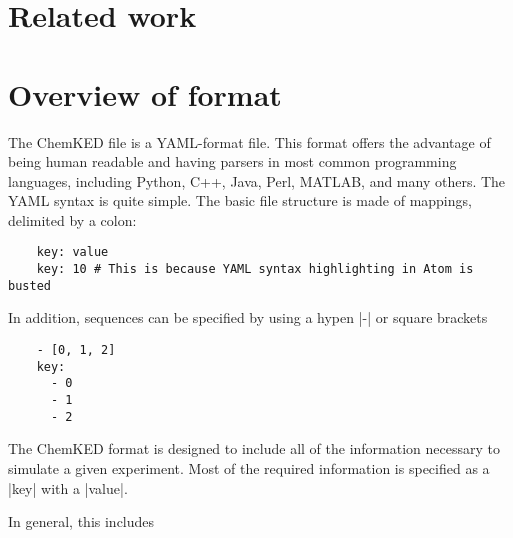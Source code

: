\documentclass[12pt]{ussci}
\newcommand\ck{ChemKED}
\begin{document}
\section{Related work}
%


\section{Overview of format}\label{sec:overview-of-format}

The \ck{} file is a YAML-format file. This format offers the advantage of being
human readable and having parsers in most common programming languages,
including Python, C++, Java, Perl, MATLAB, and many others. The YAML syntax is
quite simple. The basic file structure is made of mappings, delimited by a colon:

\begin{verbatim}
    key: value
    key: 10 # This is because YAML syntax highlighting in Atom is busted
\end{verbatim}

In addition, sequences can be specified by using a hypen \yaml|-| or square
brackets

\begin{verbatim}
    - [0, 1, 2]
    key:
      - 0
      - 1
      - 2
\end{verbatim}

The \ck{} format is designed
to include all of the information necessary to simulate a given experiment. Most
of the required information is specified as a \yaml|key| with a \yaml|value|.

In
general, this includes
\end{document}

